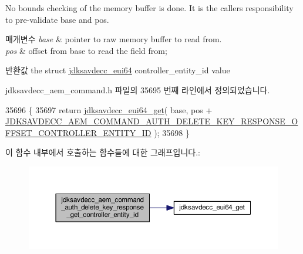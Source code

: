 No bounds checking of the memory buffer is done. It is the caller\textquotesingle{}s responsibility to pre-\/validate base and pos.


\begin{DoxyParams}{매개변수}
{\em base} & pointer to raw memory buffer to read from. \\
\hline
{\em pos} & offset from base to read the field from; \\
\hline
\end{DoxyParams}
\begin{DoxyReturn}{반환값}
the struct \hyperlink{structjdksavdecc__eui64}{jdksavdecc\+\_\+eui64} controller\+\_\+entity\+\_\+id value 
\end{DoxyReturn}


jdksavdecc\+\_\+aem\+\_\+command.\+h 파일의 35695 번째 라인에서 정의되었습니다.


\begin{DoxyCode}
35696 \{
35697     \textcolor{keywordflow}{return} \hyperlink{group__eui64_ga2652311a25a6b91cddbed75c108c7031}{jdksavdecc\_eui64\_get}( base, pos + 
      \hyperlink{group__command__auth__delete__key__response_gaa3bc03b65a304de6150efe283b643947}{JDKSAVDECC\_AEM\_COMMAND\_AUTH\_DELETE\_KEY\_RESPONSE\_OFFSET\_CONTROLLER\_ENTITY\_ID}
       );
35698 \}
\end{DoxyCode}


이 함수 내부에서 호출하는 함수들에 대한 그래프입니다.\+:
\nopagebreak
\begin{figure}[H]
\begin{center}
\leavevmode
\includegraphics[width=350pt]{group__command__auth__delete__key__response_gaef80511851e5bb39c984bb62fdd3b4a6_cgraph}
\end{center}
\end{figure}


